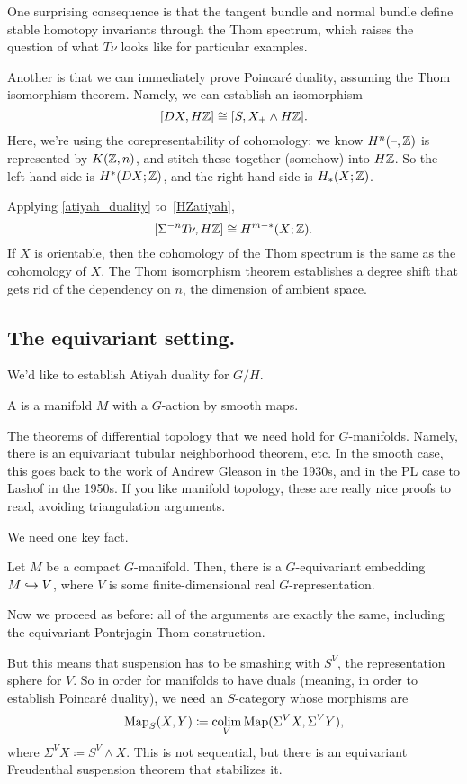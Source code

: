 One surprising consequence is that the tangent bundle and normal bundle define stable homotopy invariants through
the Thom spectrum, which raises the question of what $T\!\nu$ looks like for particular examples.

Another is that we can immediately prove Poincaré duality, assuming the Thom isomorphism theorem. Namely, we can
establish an isomorphism
\begin{equation}
\label{HZatiyah}
[DX, H\mathbb Z] \cong [S, X_+\wedge H\mathbb Z].
\end{equation}
Here, we're using the corepresentability of cohomology: we know $H^n(\text{--},\mathbb Z)$ is represented by $K(\mathbb Z, n)$, and
stitch these together (somehow) into $H\mathbb Z$. So the left-hand side is $H^*(DX;\mathbb Z)$, and the right-hand side is
$H_*(X;\mathbb Z)$.

Applying \cref{atiyah_duality} to~\eqref{HZatiyah},
\[[\Sigma^{-n} T\!\nu, H\mathbb Z]\cong H^{m-*}(X;\mathbb Z).\]
If $X$ is orientable, then the cohomology of the Thom spectrum is the same as the cohomology of $X$. The Thom
isomorphism theorem establishes a degree shift that gets rid of the dependency on $n$, the dimension of ambient
space.
\subsection*{The equivariant setting.}
We'd like to establish Atiyah duality for $G/H$.
\begin{defn}
A  is a manifold $M$ with a $G$-action by smooth maps.
\end{defn}
The theorems of differential topology that we need hold for $G$-manifolds. Namely, there is an equivariant tubular
neighborhood theorem, etc. In the smooth case, this goes back to the work of Andrew Gleason in the 1930s, and in
the PL case to Lashof in the 1950s. If you like manifold topology, these are really nice proofs to read, avoiding
triangulation arguments.

We need one key fact.
\begin{thm}
Let $M$ be a compact $G$-manifold. Then, there is a $G$-equivariant embedding $M\hookrightarrow V$, where $V$ is some
finite-dimensional real $G$-representation.
\end{thm}
Now we proceed as before: all of the arguments are exactly the same, including the equivariant Pontrjagin-Thom
construction.

But this means that suspension has to be smashing with $S^V$, the representation sphere for $V$. So in order for
manifolds to have duals (meaning, in order to establish Poincaré duality), we need an $S$-category whose morphisms
are
\[\operatorname{Map}_S(X,Y)\coloneqq \operatorname*{colim}_V \operatorname{Map}(\Sigma^V X, \Sigma^V Y),\]
where $\Sigma^V X\coloneqq S^V\wedge X$. This is not sequential, but there is an equivariant Freudenthal suspension
theorem that stabilizes it.

